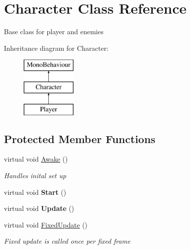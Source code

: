 \hypertarget{class_character}{}\section{Character Class Reference}
\label{class_character}


Base class for player and enemies  


Inheritance diagram for Character\+:\begin{figure}[H]
\begin{center}
\leavevmode
\includegraphics[height=3.000000cm]{class_character}
\end{center}
\end{figure}
\subsection*{Protected Member Functions}
\begin{DoxyCompactItemize}
\item 
virtual void \mbox{\hyperlink{class_character_a7cca5d1f141f2f46a1d087fd3e28a953}{Awake}} ()
\begin{DoxyCompactList}\small\item\em Handles inital set up \end{DoxyCompactList}\item 
\mbox{\label{class_character_a98bebdb5d37a51749749f0684f14a6ca}} 
virtual void {\bfseries Start} ()
\item 
\mbox{\label{class_character_aeabbd75a8c44cc4542112852ca735f2d}} 
virtual void {\bfseries Update} ()
\item 
virtual void \mbox{\hyperlink{class_character_ad90105ab5e234884e5bca7ce5bd2c50e}{Fixed\+Update}} ()
\begin{DoxyCompactList}\small\item\em Fixed update is called once per fixed frame \end{DoxyCompactList}\end{DoxyCompactItemize}

